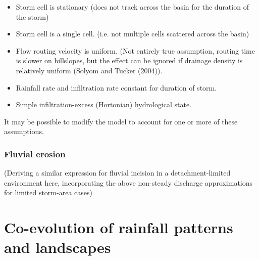 \documentclass[12pt,oneside,PhD]{muthesis}
\begin{document}
\begin{itemize}
\item Storm cell is stationary (does not track across the basin for the duration of the storm)
\item Storm cell is a single cell. (i.e. not multiple cells scattered across the basin)
\item Flow routing velocity is uniform. (Not entirely true assumption, routing time is slower on hillslopes, but the effect can be ignored if drainage density is relatively uniform (Solyom and Tucker (2004)).
\item Rainfall rate and infiltration rate constant for duration of storm.
\item Simple infiltration-excess (Hortonian) hydrological state.

\end{itemize}
It may be possible to modify the model to account for one or more of these assumptions.


\subsection{Fluvial erosion}
(Deriving a similar expression for fluvial incision in a detachment-limited environment here, incorporating the above non-steady discharge approximations for limited storm-area cases) 


%
%
%


\chapter{Co-evolution of rainfall patterns and landscapes}
\end{document}
